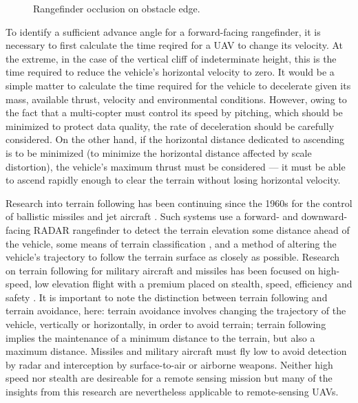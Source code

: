 \documentclass[10pt,a4paper]{report}
\begin{document}
\begin{figure}
\centering
\def\svgscale{0.8}

\caption{Rangefinder occlusion on obstacle edge.}
\label{fig:uav_edge_occlude}
\end{figure}

To identify a sufficient advance angle for a forward-facing rangefinder, it is necessary to first calculate the time reqired for a UAV to change its velocity. At the extreme, in the case of the vertical cliff of indeterminate height, this is the time required to reduce the vehicle's horizontal velocity to zero. It would be a simple matter to calculate the time required for the vehicle to decelerate given its mass, available thrust, velocity and environmental conditions. However, owing to the fact that a multi-copter must control its speed by pitching, which should be minimized to protect data quality, the rate of deceleration should be carefully considered. On the other hand, if the horizontal distance dedicated to ascending is to be minimized (to minimize the horizontal distance affected by scale distortion), the vehicle's maximum thrust must be considered --- it must be able to ascend rapidly enough to clear the terrain without losing horizontal velocity.

Research into terrain following has been continuing since the 1960s for the control of ballistic missiles and jet aircraft \cite{KRACHMALNICK1968,Starling1971,Cunningham1980}. Such systems use a forward- and downward-facing RADAR rangefinder to detect the terrain elevation some distance ahead of the vehicle, some means of terrain classification \cite{Cunningham1980}, and a method of altering the vehicle's trajectory to follow the terrain surface as closely as possible. Research on terrain following for military aircraft and missiles has been focused on high-speed, low elevation flight with a premium placed on stealth, speed, efficiency and safety \cite{KRACHMALNICK1968}. It is important to note the distinction between terrain following and terrain avoidance, here: terrain avoidance involves changing the trajectory of the vehicle, vertically or horizontally, in order to avoid terrain; terrain following implies the maintenance of a minimum distance to the terrain, but also a maximum distance. Missiles and military aircraft must fly low to avoid detection by radar and interception by surface-to-air or airborne weapons. Neither high speed nor stealth are desireable for a remote sensing mission but many of the insights from this research are nevertheless applicable to remote-sensing UAVs.
\end{document}

